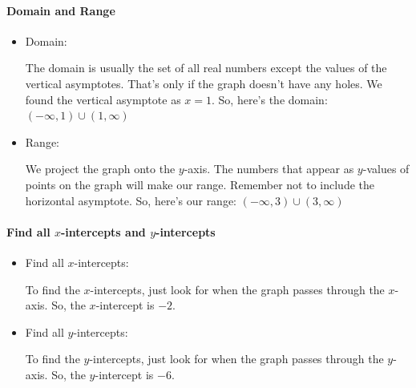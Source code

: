 
\paragraph{Domain and Range}
\label{par:domain_and_range}

\begin{itemize}
  \label{item:domain_and_range}

  \item Domain:

    The domain is usually the set of all real numbers except the values of the
    vertical asymptotes. That's only if the graph doesn't have any holes. We
    found the vertical asymptote as $x = 1$. So, here's the domain:
    $(-\infty, 1) \cup (1, \infty)$ 

  \item Range:

    We project the graph onto the $y$-axis. The numbers that appear as
    $y$-values of points on the graph will make our range. Remember not to
    include the horizontal asymptote. So, here's our range:
    $(-\infty, 3) \cup (3, \infty)$
\end{itemize}


\paragraph{Find all $x$-intercepts and $y$-intercepts}
\label{par:find_all_x_intercepts_and_y_intercepts}

\begin{itemize}
  \label{item:find_all_x_intercepts_and_y_intercepts}

  \item Find all $x$-intercepts:

    To find the $x$-intercepts, just look for when the graph passes through the
    $x$-axis. So, the $x$-intercept is $-2$.

  \item Find all $y$-intercepts:

    To find the $y$-intercepts, just look for when the graph passes through the
    $y$-axis. So, the $y$-intercept is $-6$.
\end{itemize}


\newpage
